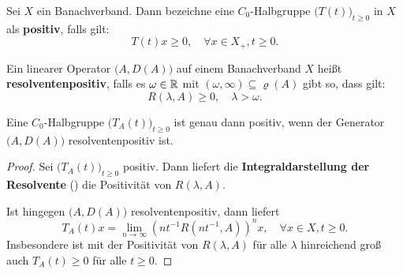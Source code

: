 \begin{defi}
Sei $X$ ein Banachverband. Dann bezeichne eine $C_0$-Halbgruppe $\big(T(t)\big)_{t\geq0}$ in $X$ als \textbf{positiv}, falls gilt:
\begin{equation*}
T(t)x\geq0, \quad\forall x\in X_+, t\geq 0.
\end{equation*}
\end{defi}

\begin{defi}
Ein linearer Operator $\big(A, D(A)\big)$ auf einem Banachverband $X$ heißt \textbf{resolventenpositiv}, falls es $\omega\in\mathbb{R}$ mit $(\omega,\infty)\subseteq \varrho(A)$ gibt so, dass gilt:
\begin{equation*}
R(\lambda, A)\geq 0, \quad \lambda >  \omega.
\end{equation*}
\end{defi}

\begin{satz}\label{Charakterisierung Positiver Halbgruppen}%
Eine $C_0$-Halbgruppe $\big(T_A(t)\big)_{t\geq0}$ ist genau dann positiv, wenn  der Generator $\big(A, D(A)\big)$ resolventenpositiv ist.
\end{satz}

\begin{proof}
Sei $\big(T_A(t)\big)_{t\geq0}$ positiv. Dann liefert die \textbf{Integraldarstellung der Resolvente} () die Positivität von $R(\lambda, A)$.

\par
Ist hingegen $\big(A, D(A)\big)$ resolventenpositiv, dann liefert 
\begin{equation*}
    T_A(t)x=\lim_{n\to\infty}(nt^{-1}R(nt^{-1}, A))^nx,\quad\forall x\in X, t\geq0.
\end{equation*}
Insbesondere ist mit der Positivität von $R(\lambda, A)$ für alle $\lambda$ hinreichend groß auch  $T_A(t)\geq0$ für alle $t\geq0$.
\end{proof}

